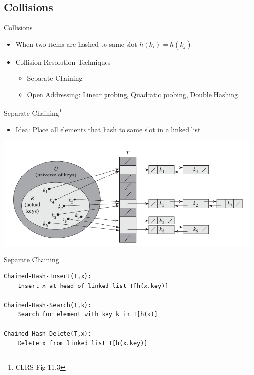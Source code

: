 \documentclass{beamer}
\begin{document}
\subsection{Collisions}
\begin{frame}{Collisions}
    \begin{itemize}
        \item When two items are hashed to same slot $h(k_i) = h(k_j)$
        \item Collision Resolution Techniques
        \begin{itemize}
            \item Separate Chaining
            \item Open Addressing: Linear probing, Quadratic probing, Double Hashing
        \end{itemize}
    \end{itemize}
\end{frame}


\begin{frame}{Separate Chaining\footnote{CLRS Fig 11.3}}
    \begin{itemize}
        \item Idea: Place all elements that hash to same slot in a linked list 
    \end{itemize}
    \begin{center}
        \includegraphics[scale=0.36]{hashTablesChaining.png}
    \end{center}
\end{frame}

\begin{frame}[fragile]{Separate Chaining}
    \begin{verbatim}
Chained-Hash-Insert(T,x):
    Insert x at head of linked list T[h(x.key)]

Chained-Hash-Search(T,k):
    Search for element with key k in T[h(k)]

Chained-Hash-Delete(T,x):
    Delete x from linked list T[h(x.key)] 
    \end{verbatim}
\end{frame}
\end{document}
